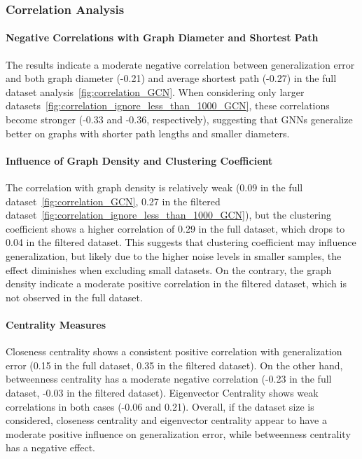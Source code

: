 \subsubsection{Correlation Analysis}

\paragraph{Negative Correlations with Graph Diameter and Shortest Path}
The results indicate a moderate negative correlation between generalization error and both graph diameter (-0.21) and average shortest path (-0.27) in the full dataset analysis~\ref{fig:correlation_GCN}. When considering only larger datasets~\ref{fig:correlation_ignore_less_than_1000_GCN}, these correlations become stronger (-0.33 and -0.36, respectively), suggesting that GNNs generalize better on graphs with shorter path lengths and smaller diameters. 

\paragraph{Influence of Graph Density and Clustering Coefficient}
The correlation with graph density is relatively weak (0.09 in the full dataset~\ref{fig:correlation_GCN}, 0.27 in the filtered dataset~\ref{fig:correlation_ignore_less_than_1000_GCN}), but the clustering coefficient shows a higher correlation of 0.29 in the full dataset, which drops to 0.04 in the filtered dataset. This suggests that clustering coefficient may influence generalization, but likely due to the higher noise levels in smaller samples, the effect diminishes when excluding small datasets. On the contrary, the graph density indicate a moderate positive correlation in the filtered dataset, which is not observed in the full dataset.


\paragraph{Centrality Measures}
Closeness centrality shows a consistent positive correlation with generalization error (0.15 in the full dataset, 0.35 in the filtered dataset). On the other hand, betweenness centrality has a moderate negative correlation (-0.23 in the full dataset, -0.03 in the filtered dataset). Eigenvector Centrality shows weak correlations in both cases (-0.06 and 0.21). Overall, if the dataset size is considered, closeness centrality and eigenvector centrality appear to have a moderate positive influence on generalization error, while betweenness centrality has a negative effect.

